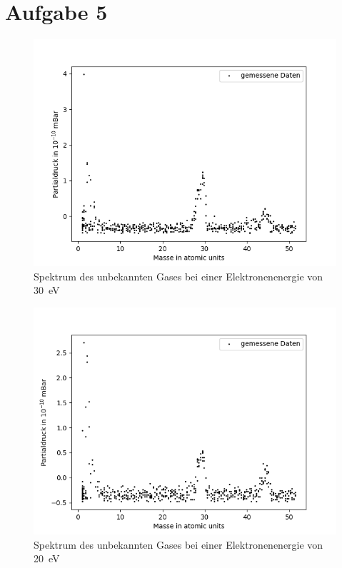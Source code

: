 \section{Aufgabe 5}
\begin{figure}[H]
    \centering
    \includegraphics[width=120mm,scale=0.8]{Massenspektrometer/include/MS30eV.png}
    \caption{Spektrum des unbekannten Gases bei einer Elektronenenergie von \SI{30}{eV}}
    \label{fig:MS30eV}
\end{figure}

\begin{figure}[H]
    \centering
    \includegraphics[width=120mm,scale=0.8]{Massenspektrometer/include/MS20eV.png}
    \caption{Spektrum des unbekannten Gases bei einer Elektronenenergie von \SI{20}{eV}}
    \label{fig:MS20eV}
\end{figure}
